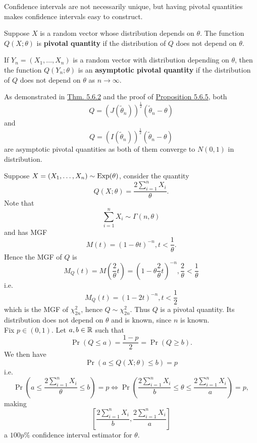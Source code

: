 \documentclass[11pt,fleqn]{book} %
\begin{document}
\begin{remark} \label{rmk:573}
Confidence intervals are not necessarily unique, but having pivotal quantities makes confidence intervals easy to construct.
\end{remark}

\begin{definition} \label{def:574}
Suppose \(X\) is a random vector whose distribution depends on \(\theta\). The function \(Q(X; \theta)\) is \textbf{pivotal quantity} if the distribution of \(Q\) does not depend on \(\theta\).
\end{definition}

\begin{definition} \label{def:575}
If \(Y_n = (X_1, \ldots, X_n)\) is a random vector with distribution depending on \(\theta\), then the function \(Q(Y_n; \theta)\) is an \textbf{asymptotic pivotal quantity} if the distribution of \(Q\) does not depend on \(\theta\) as \(n\rightarrow\infty\).
\end{definition}

\begin{example} \label{eg:576}
As demonstrated in \hyperref[thm:562]{Thm. 5.6.2} and the proof of \hyperref[prop:565]{Proposition 5.6.5}, both
\[
Q = (J(\tilde{\theta}_n))^{\frac12}(\tilde{\theta}_n - \theta)
\]
and
\[
Q = (I(\tilde{\theta}_n))^{\frac12}(\tilde{\theta}_n - \theta)
\]
are asymptotic pivotal quantities as both of them converge to \(N(0, 1)\) in distribution.
\end{example}

\begin{example} \label{eg:577}
Suppose \(X = (X_1, \ldots, X_n) \sim \operatorname{Exp}(\theta)\), consider the quantity
\[
Q(X; \theta) = \frac{2\sum_{i=1}^n X_i}{\theta}.
\]
\indent Note that
\[
\sum_{i=1}^n X_i \sim \Gamma(n, \theta)
\]
and has MGF
\[
M(t) = (1 - \theta t)^{-n}, t < \frac1\theta.
\]
\indent Hence the MGF of \(Q\) is
\[
M_Q(t) = M\left(\frac2\theta t\right) = \left(1 - \theta\frac2\theta t\right)^{-n}, \frac2\theta < \frac1\theta
\]
i.e.
\[
M_Q(t) = (1 - 2t)^{-n}, t < \frac12
\]
which is the MGF of \(\chi^2_{2n}\), hence \(Q \sim \chi^2_{2n}\). Thus \(Q\) is a pivotal quantity. Its distribution does not depend on \(\theta\) and is known, since \(n\) is known. \\
\indent Fix \(p \in (0, 1)\). Let \(a, b \in \mathbb{R}\) such that
\[
\Pr(Q \leq a) = \frac{1 - p}{2} = \Pr(Q \geq b).
\]
\indent We then have
\[
\Pr(a \leq Q(X; \theta) \leq b) = p
\]
i.e.
\[
\Pr\left(a \leq \frac{2\sum_{i=1}^nX_i}{\theta} \leq b\right) = p
\Leftrightarrow
\Pr\left(\frac{2\sum_{i=1}^nX_i}{b} \leq \theta \leq \frac{2\sum_{i=1}^nX_i}{a}\right) = p,
\]
making
\[
\left[\frac{2\sum_{i=1}^nX_i}{b}, \frac{2\sum_{i=1}^nX_i}{a}\right]
\]
a \(100p\%\) confidence interval estimator for \(\theta\).
\end{example}
\end{document}

